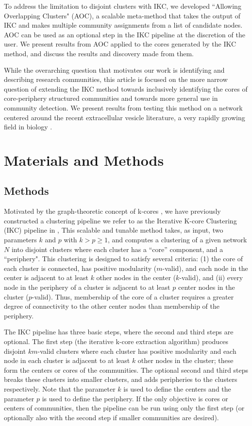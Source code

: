 \documentclass[12pt, oneside]{article}   	%
\begin{document}
	To address the limitation to disjoint clusters with IKC, we developed  ``Allowing Overlapping Clusters" (AOC), a scalable meta-method that takes the output of IKC and makes multiple community assignments from a list of candidate nodes. AOC can be used as an optional step in the IKC pipeline at the discretion of the user. We present results from AOC applied to the cores generated by the IKC method, and discuss the results and discovery made from them. 
	
	While the overarching question that motivates our work is identifying and describing research communities, this article is focused on the more narrow question of extending the IKC method towards inclusively identifying the cores of core-periphery structured communities and towards more general use in community detection. We present results from testing this method on a network centered around the recent extracellular vesicle literature, a very rapidly growing field in biology \citep{van2022challenges}. 
	
	\section{Materials and Methods}
	
	\subsection{Methods} Motivated by the graph-theoretic concept of k-cores \citep{Giatsidis2011,malliaros2019}, we have previously constructed a clustering pipeline we refer to as  the Iterative K-core Clustering (IKC) pipeline in \cite{Wedell2022}, This scalable and tunable method takes, as input, two parameters $k$ and $p$ with $k > p \geq 1$, and computes a clustering of a given network $N$ into disjoint clusters where each cluster has a ``core'' component, and a ``periphery". This clustering is designed to satisfy several criteria: (1) the core of each cluster is connected,  has positive modularity ($m$-valid), and each node in the center  is adjacent to at least $k$ other nodes in the center ($k$-valid), and (ii) every node in the periphery of a cluster is adjacent to at least $p$ center nodes in the cluster ($p$-valid). Thus, membership of the core of a cluster requires a greater degree of connectivity to the other center nodes than membership of the periphery. 
	
	The IKC pipeline has three basic steps, where the second and third steps are optional.  The first step (the iterative k-core extraction algorithm) produces disjoint $km$-valid clusters where each cluster has positive modularity and each node in each cluster is adjacent to at least $k$ other nodes in the cluster; these form the centers or cores of the communities. The optional second and third steps breaks these clusters into smaller clusters, and adds peripheries to the clusters respectively.  Note that the parameter $k$ is used to define the centers and the parameter $p$ is used to define the periphery. If the only objective is cores or centers of communities, then the pipeline can be run using only the first step (or optionally also with the second step if smaller communities are desired).
	
\end{document}
